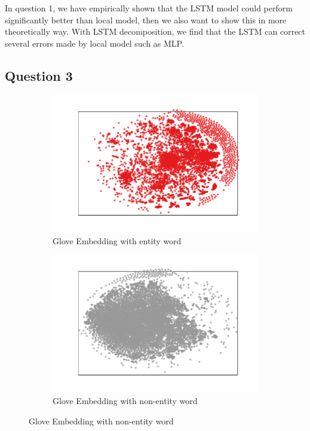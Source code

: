 \documentclass{article}
\begin{document}
In question 1, we have empirically shown that the LSTM model could perform significantly better than local model, then we also want to show this in more theoretically way. With LSTM decomposition, we find that the LSTM can correct several errors made by local model such as MLP. 





\subsection{Question 3}

\begin{figure}[t]
	\centering
	\begin{subfigure}{0.5\textwidth}
		\includegraphics[width=\linewidth]{glove_embedding_positive.pdf}
		\caption{Glove Embedding with entity word}
		\label{fig:glove_positive}
	\end{subfigure}\hfil 
	\begin{subfigure}{0.5\textwidth}
		\includegraphics[width=\linewidth]{glove_embedding_negative.pdf}
		\caption{Glove Embedding with non-entity word}
		\label{fig:glove_negative}
	\end{subfigure}
\end{figure}
\end{document}
